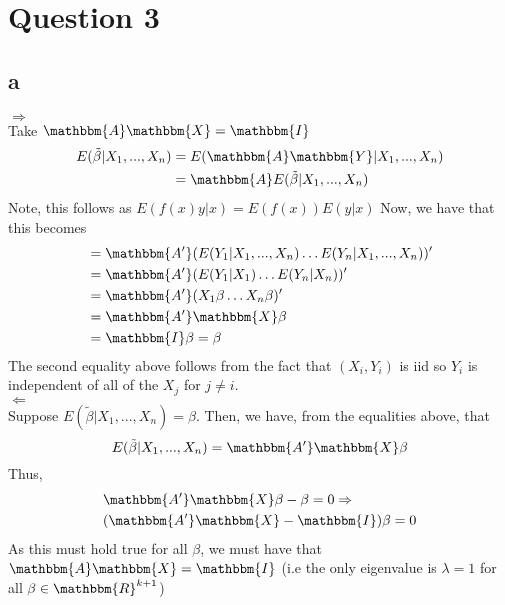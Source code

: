 \documentclass[12pt]{paper}
\begin{document}
\section*{Question 3}
\subsection*{a}
$\Rightarrow$ \\
Take $\mathbbm{A}\mathbbm{X} = \mathbbm{I}$
\begin{align}
    E(\tilde \beta | X_1,...,X_n) & = E(\mathbbm{A} \mathbbm{Y}|X_1,...,X_n ) \\
&=  \mathbbm{A} E(\tilde \beta | X_1,...,X_n)
\end{align}
Note, this follows as $E(f(x)y|x) = E(f(x))E(y|x)$
Now, we have that this becomes
\begin{align*}
 & = \mathbbm{A'}(E(Y_1|X_1,...,X_n) \dots E(Y_n|X_1,...,X_n))' \\
&=  \mathbbm{A'}(E(Y_1|X_1) \dots E(Y_n|X_n))' \\
&=  \mathbbm{A'}(X_1\beta \dots X_n\beta)' \\
&=  \mathbbm{A'}\mathbbm{X}\beta \\
&=  \mathbbm{I}\beta = \beta \\
\end{align*}
The second equality above follows from the fact that $(X_i,Y_i)$ is iid so $Y_i$ is independent of all of the $X_j$ for $j \neq i$. \\
$\Leftarrow$ \\
Suppose $ E(\tilde \beta | X_1,...,X_n) = \beta$. Then, we have, from the equalities above, that  
$$E(\tilde \beta | X_1,...,X_n) =  \mathbbm{A'}\mathbbm{X}\beta $$
Thus,
\begin{align*}
     & \mathbbm{A'}\mathbbm{X}\beta - \beta = 0  \Rightarrow \\
    & (\mathbbm{A'}\mathbbm{X} - \mathbbm{I})\beta = 0
\end{align*}  
As this must hold true for all $\beta$, we must have that $\mathbbm{A}\mathbbm{X} = \mathbbm{I}$ (i.e the only eigenvalue is $\lambda = 1$ for all $\beta \in \mathbbm{R}^{k+1}$)
\end{document}
